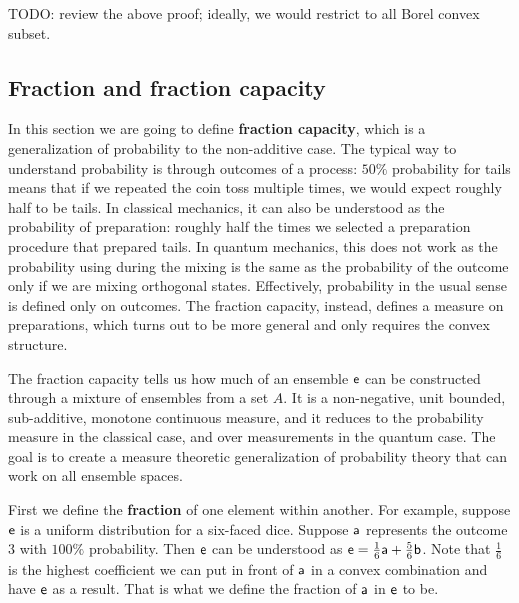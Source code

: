 TODO: review the above proof; ideally, we would restrict to all Borel convex subset.


\subsection{Fraction and fraction capacity}

In this section we are going to define \textbf{fraction capacity}, which is a generalization of probability to the non-additive case. The typical way to understand probability is through outcomes of a process: $50\%$ probability for tails means that if we repeated the coin toss multiple times, we would expect roughly half to be tails. In classical mechanics, it can also be understood as the probability of preparation: roughly half the times we selected a preparation procedure that prepared tails. In quantum mechanics, this does not work as the probability using during the mixing is the same as the probability of the outcome only if we are mixing orthogonal states. Effectively, probability in the usual sense is defined only on outcomes. The fraction capacity, instead, defines a measure on preparations, which turns out to be more general and only requires the convex structure.

The fraction capacity tells us how much of an ensemble $\ens$ can be constructed through a mixture of ensembles from a set $A$. It is a non-negative, unit bounded, sub-additive, monotone continuous measure, and it reduces to the probability measure in the classical case, and over measurements in the quantum case. The goal is to create a measure theoretic generalization of probability theory that can work on all ensemble spaces.

First we define the \textbf{fraction} of one element within another. For example, suppose $\ens$ is a uniform distribution for a six-faced dice. Suppose $\ens[a]$ represents the outcome $3$ with $100\%$ probability. Then $\ens$ can be understood as $\ens = \frac{1}{6} \ens[a] + \frac{5}{6} \ens[b]$. Note that $\frac{1}{6}$ is the highest coefficient we can put in front of $\ens[a]$ in a convex combination and have $\ens$ as a result. That is what we define the fraction of $\ens[a]$ in $\ens$ to be.

